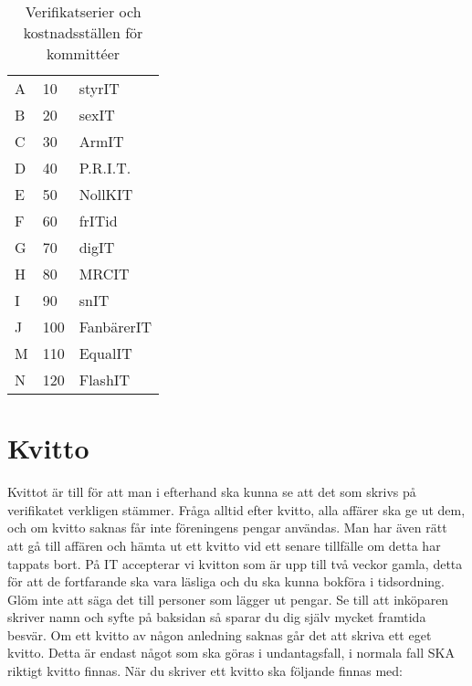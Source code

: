 \documentclass{article}
\begin{document}



\begin{table}[h]
\centering
\caption{Verifikatserier och kostnadsställen för kommittéer}
\label{committee-verifikat}
\begin{tabular}{lll}
A & 10 & styrIT     \\
B & 20 & sexIT      \\
C & 30 & ArmIT      \\
D & 40 & P.R.I.T.   \\
E & 50 & NollKIT    \\
F & 60 & frITid     \\
G & 70 & digIT      \\
H & 80 & MRCIT \\
I & 90 & snIT       \\
J & 100 & FanbärerIT \\
M & 110 & EqualIT \\
N & 120 & FlashIT \\
\end{tabular}
\end{table}


\section{Kvitto}
Kvittot är till för att man i efterhand ska kunna se att det som skrivs på verifikatet verkligen stämmer. Fråga alltid efter kvitto, alla affärer ska ge ut dem, och om kvitto saknas får inte föreningens pengar användas. Man har även rätt att gå till affären och hämta ut ett kvitto
vid ett senare tillfälle om detta har tappats bort.
På IT accepterar vi kvitton som är upp till två veckor gamla, detta för att de fortfarande ska vara läsliga och du ska kunna bokföra i tidsordning. Glöm inte att säga det till personer som lägger ut pengar. Se till att inköparen skriver namn och syfte på baksidan så sparar du dig själv
mycket framtida besvär. Om ett kvitto av någon anledning saknas går det att skriva ett eget kvitto. Detta är
endast något som ska göras i undantagsfall, i normala fall SKA riktigt kvitto finnas. När du
skriver ett kvitto ska följande finnas med:
\end{document}
